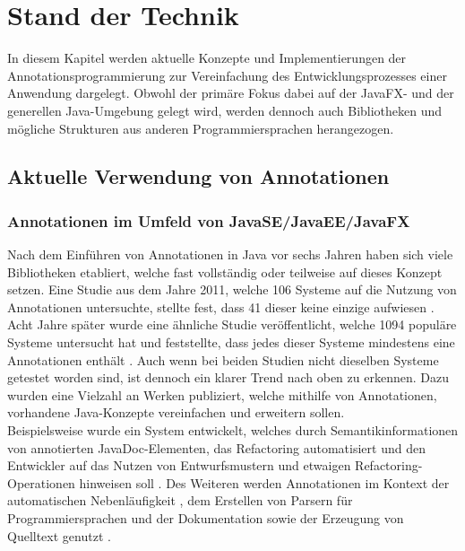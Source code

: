 \chapter{Stand der Technik}
\label{stand_der_technik}
\noindent In diesem Kapitel werden aktuelle Konzepte und Implementierungen der Annotationsprogrammierung zur Vereinfachung des Entwicklungsprozesses einer Anwendung dargelegt. Obwohl der primäre Fokus dabei auf der JavaFX- und der generellen Java-Umgebung gelegt wird, werden dennoch auch Bibliotheken und mögliche Strukturen aus anderen Programmiersprachen herangezogen.

\section{Aktuelle Verwendung von Annotationen}
\label{aktuelle_verwendung_von_annotationen}

\subsection{Annotationen im Umfeld von JavaSE/JavaEE/JavaFX}
\label{verwendung_im_umfeld_von_java}
Nach dem Einführen von Annotationen in Java vor sechs Jahren haben sich viele Bibliotheken etabliert, welche fast vollständig oder teilweise auf dieses Konzept setzen. Eine Studie aus dem Jahre 2011, welche 106 Systeme auf die Nutzung von Annotationen untersuchte, stellte fest, dass 41 dieser keine einzige aufwiesen \cite{Rocha2011}. Acht Jahre später wurde eine ähnliche Studie veröffentlicht, welche 1094 populäre Systeme untersucht hat und feststellte, dass jedes dieser Systeme mindestens eine Annotationen enthält \cite{Yu2019}. Auch wenn bei beiden Studien nicht dieselben Systeme getestet worden sind, ist dennoch ein klarer Trend nach oben zu erkennen. Dazu wurden eine Vielzahl an Werken publiziert, welche mithilfe von Annotationen, vorhandene Java-Konzepte vereinfachen und erweitern sollen.\\
Beispielsweise wurde ein System entwickelt, welches durch Semantikinformationen von annotierten JavaDoc-Elementen, das Refactoring automatisiert und den Entwickler auf das Nutzen von Entwurfsmustern und etwaigen Refactoring-Operationen hinweisen soll \cite{Meffert2006}. Des Weiteren werden Annotationen im Kontext der automatischen Nebenläufigkeit \cite{Danelutto2007}, dem Erstellen von Parsern für Programmiersprachen \cite{Porubaen2009} und der Dokumentation sowie der Erzeugung von Quelltext genutzt \cite{Sulir2016, Miroslav2009}.

